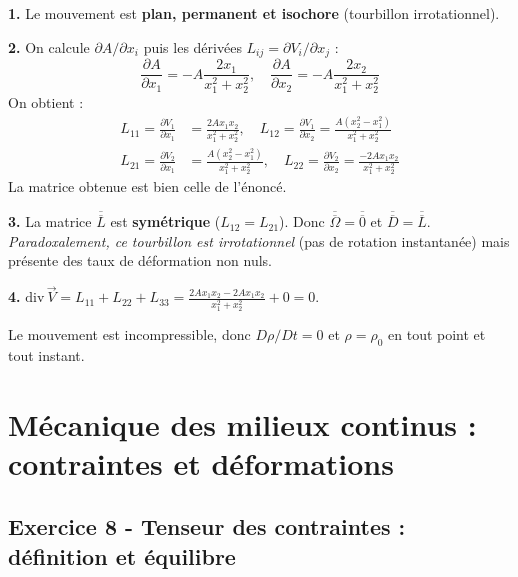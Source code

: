 \documentclass[12pt,a4paper]{article}
\begin{document}
\begin{boitecorrige}
\textbf{1.} Le mouvement est \textbf{plan, permanent et isochore} (tourbillon irrotationnel).

\textbf{2.} On calcule $\partial A/\partial x_i$ puis les dérivées $L_{ij} = \partial V_i/\partial x_j$ :
\[
\frac{\partial A}{\partial x_1} = -A\frac{2x_1}{x_1^2+x_2^2}, \quad \frac{\partial A}{\partial x_2} = -A\frac{2x_2}{x_1^2+x_2^2}
\]
On obtient :
\begin{align*}
L_{11} = \frac{\partial V_1}{\partial x_1} &= \frac{2Ax_1x_2}{x_1^2+x_2^2}, \quad
L_{12} = \frac{\partial V_1}{\partial x_2} = \frac{A(x_2^2-x_1^2)}{x_1^2+x_2^2}\\
L_{21} = \frac{\partial V_2}{\partial x_1} &= \frac{A(x_2^2-x_1^2)}{x_1^2+x_2^2}, \quad
L_{22} = \frac{\partial V_2}{\partial x_2} = \frac{-2Ax_1x_2}{x_1^2+x_2^2}
\end{align*}
La matrice obtenue est bien celle de l'énoncé.

\textbf{3.} La matrice $\overline{\overline{L}}$ est \textbf{symétrique} ($L_{12} = L_{21}$). Donc $\overline{\overline{\Omega}} = \overline{\overline{0}}$ et $\overline{\overline{D}} = \overline{\overline{L}}$. \textit{Paradoxalement, ce tourbillon est irrotationnel} (pas de rotation instantanée) mais présente des taux de déformation non nuls.

\textbf{4.} $\mathrm{div}\,\vec{V} = L_{11} + L_{22} + L_{33} = \frac{2Ax_1x_2 - 2Ax_1x_2}{x_1^2+x_2^2} + 0 = 0$.

Le mouvement est incompressible, donc $D\rho/Dt = 0$ et $\rho = \rho_0$ en tout point et tout instant.
\end{boitecorrige}


\newpage
\section{Mécanique des milieux continus : contraintes et déformations}

\subsection*{Exercice 8 - Tenseur des contraintes : définition et équilibre \niveau{\moyen}}
\end{document}
